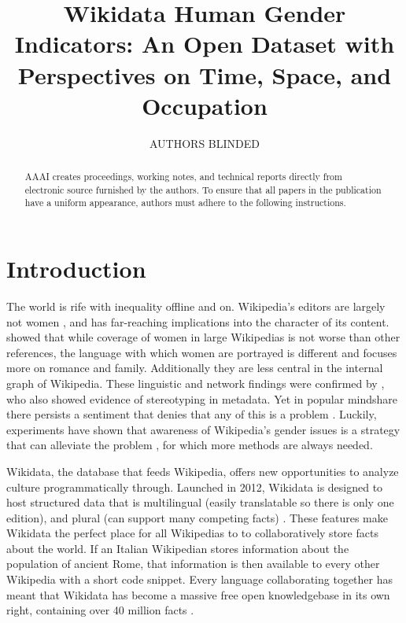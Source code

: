 \documentclass[letterpaper]{article}
\begin{document}
%
\title{Wikidata Human Gender Indicators: An Open Dataset with Perspectives on Time, Space, and Occupation}

\author{AUTHORS BLINDED}
    
\maketitle
\begin{abstract}
AAAI creates proceedings, working notes, and technical reports directly from electronic source furnished by the authors. To ensure that all papers in the publication have a uniform appearance, authors must adhere to the following instructions. 
\end{abstract}


\section{Introduction}
The world is rife with inequality offline and on. Wikipedia's editors are largely not women \cite{hill_wikipedia_2013}, and has far-reaching implications into the character of its content. \cite{wagner_its_2015} showed that while coverage of women in large Wikipedias is not worse than other references, the language with which women are portrayed is different and focuses more on romance and family. Additionally they are less central in the internal graph of Wikipedia. These linguistic and network findings were confirmed by \cite{graells-garrido_first_2015}, who also showed evidence of stereotyping in metadata. Yet in popular mindshare there persists a sentiment that denies that any of this is a problem \cite{eckert_retriggering_2013}. Luckily, experiments have shown that awareness of Wikipedia's gender issues is a strategy that can alleviate the problem \cite{hinnosaar_gender_2015}, for which more methods are always needed.

Wikidata, the database that feeds Wikipedia, offers new opportunities to analyze culture programmatically through. Launched in 2012, Wikidata is designed to host structured data that is multilingual (easily translatable so there is only one edition), and plural (can support many competing facts) \cite{vrandecic_wikidata:_2014}.  These features make Wikidata the perfect place for all Wikipedias to to collaboratively store facts about the world. If an Italian Wikipedian stores information about the population of ancient Rome, that information is then available to every other Wikipedia with a short code snippet. Every language collaborating together has meant that Wikidata has become a massive free open knowledgebase in its own right, containing over 40 million facts \cite{krotzsch_how_????}.
\end{document}
